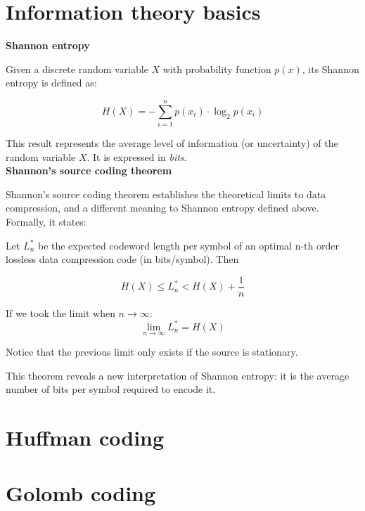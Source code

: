 \section{Information theory basics}
\large\textbf{Shannon entropy}

Given a discrete random variable $X$ with probability function $p(x)$, its Shannon entropy is defined as:

\begin{equation}
H(X) = - \sum_{i=1}^{n} p(x_i) \cdot \log_2 p(x_i) 
\end{equation}

This result represents the average level of information (or uncertainty) of the random variable $X$. It is expressed in \textit{bits}.\\


\large\textbf{Shannon's source coding theorem}

Shannon's source coding theorem establishes the theoretical limits to data compression, and a different meaning to Shannon entropy defined above. Formally, it states:

\begin{theorem}
Let $L_n^*$ be the expected codeword length per symbol of an optimal n-th order lossless data compression code (in bits/symbol). Then

\begin{equation}
	H(X) \leq L_n^* < H(X) + \frac{1}{n}
\end{equation}

If we took the limit when $n \to \infty$:
\begin{equation}
	\lim_{n \to \infty} L_n^* = H(X)
\end{equation}

Notice that the previous limit only exists if the source is stationary.
\end{theorem}

This theorem reveals a new interpretation of Shannon entropy: it is the average number of bits per symbol required to encode it.

\section{Huffman coding}

\section{Golomb coding}

